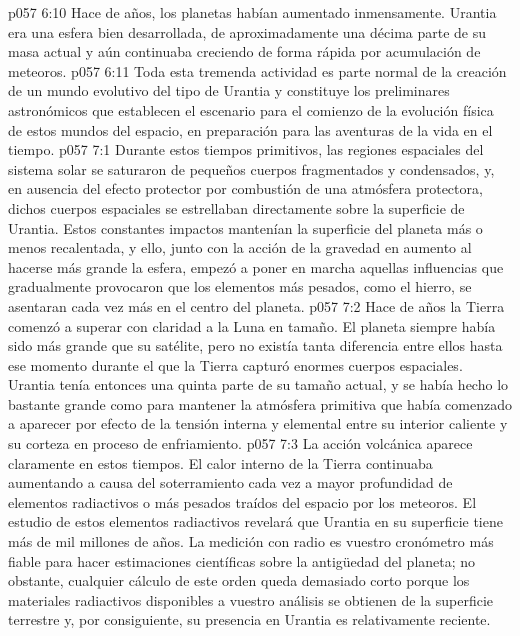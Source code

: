 \vs p057 6:10 \pc Hace  de años, los planetas habían aumentado inmensamente. Urantia era una esfera bien desarrollada, de aproximadamente una décima parte de su masa actual y aún continuaba creciendo de forma rápida por acumulación de meteoros.
\vs p057 6:11 Toda esta tremenda actividad es parte normal de la creación de un mundo evolutivo del tipo de Urantia y constituye los preliminares astronómicos que establecen el escenario para el comienzo de la evolución física de estos mundos del espacio, en preparación para las aventuras de la vida en el tiempo.
\vs p057 7:1 Durante estos tiempos primitivos, las regiones espaciales del sistema solar se saturaron de pequeños cuerpos fragmentados y condensados, y, en ausencia del efecto protector por combustión de una atmósfera protectora, dichos cuerpos espaciales se estrellaban directamente sobre la superficie de Urantia. Estos constantes impactos mantenían la superficie del planeta más o menos recalentada, y ello, junto con la acción de la gravedad en aumento al hacerse más grande la esfera, empezó a poner en marcha aquellas influencias que gradualmente provocaron que los elementos más pesados, como el hierro, se asentaran cada vez más en el centro del planeta.
\vs p057 7:2 \pc Hace  de años la Tierra comenzó a superar con claridad a la Luna en tamaño. El planeta siempre había sido más grande que su satélite, pero no existía tanta diferencia entre ellos hasta ese momento durante el que la Tierra capturó enormes cuerpos espaciales. Urantia tenía entonces una quinta parte de su tamaño actual, y se había hecho lo bastante grande como para mantener la atmósfera primitiva que había comenzado a aparecer por efecto de la tensión interna y elemental entre su interior caliente y su corteza en proceso de enfriamiento.
\vs p057 7:3 La acción volcánica aparece claramente en estos tiempos. El calor interno de la Tierra continuaba aumentando a causa del soterramiento cada vez a mayor profundidad de elementos radiactivos o más pesados traídos del espacio por los meteoros. El estudio de estos elementos radiactivos revelará que Urantia en su superficie tiene más de mil millones de años. La medición con radio es vuestro cronómetro más fiable para hacer estimaciones científicas sobre la antigüedad del planeta; no obstante, cualquier cálculo de este orden queda demasiado corto porque los materiales radiactivos disponibles a vuestro análisis se obtienen de la superficie terrestre y, por consiguiente, su presencia en Urantia es relativamente reciente.
